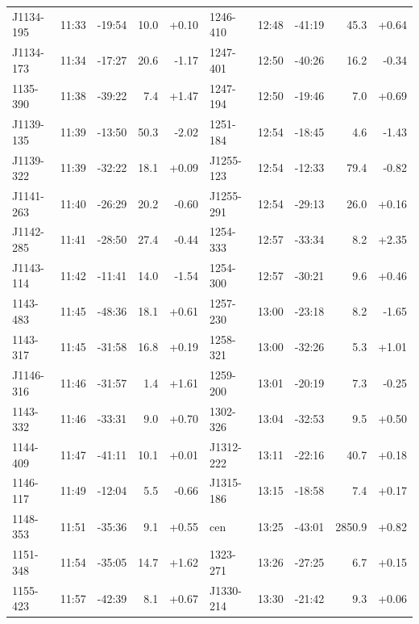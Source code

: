 \documentclass[preprint]{aastex}
\begin{document}
\begin{table}[ht]
\begin{tabular}{l|lrrr||l|lrrr}
 J1134-195 & 11:33 & -19:54 &   10.0 & +0.10 &   1246-410 & 12:48 & -41:19 &   45.3 & +0.64 \\
 J1134-173 & 11:34 & -17:27 &   20.6 & -1.17 &   1247-401 & 12:50 & -40:26 &   16.2 & -0.34 \\
  1135-390 & 11:38 & -39:22 &    7.4 & +1.47 &   1247-194 & 12:50 & -19:46 &    7.0 & +0.69 \\
 J1139-135 & 11:39 & -13:50 &   50.3 & -2.02 &   1251-184 & 12:54 & -18:45 &    4.6 & -1.43 \\
 J1139-322 & 11:39 & -32:22 &   18.1 & +0.09 &  J1255-123 & 12:54 & -12:33 &   79.4 & -0.82 \\
 J1141-263 & 11:40 & -26:29 &   20.2 & -0.60 &  J1255-291 & 12:54 & -29:13 &   26.0 & +0.16 \\
 J1142-285 & 11:41 & -28:50 &   27.4 & -0.44 &   1254-333 & 12:57 & -33:34 &    8.2 & +2.35 \\
 J1143-114 & 11:42 & -11:41 &   14.0 & -1.54 &   1254-300 & 12:57 & -30:21 &    9.6 & +0.46 \\
  1143-483 & 11:45 & -48:36 &   18.1 & +0.61 &   1257-230 & 13:00 & -23:18 &    8.2 & -1.65 \\
  1143-317 & 11:45 & -31:58 &   16.8 & +0.19 &   1258-321 & 13:00 & -32:26 &    5.3 & +1.01 \\
 J1146-316 & 11:46 & -31:57 &    1.4 & +1.61 &   1259-200 & 13:01 & -20:19 &    7.3 & -0.25 \\
  1143-332 & 11:46 & -33:31 &    9.0 & +0.70 &   1302-326 & 13:04 & -32:53 &    9.5 & +0.50 \\
  1144-409 & 11:47 & -41:11 &   10.1 & +0.01 &  J1312-222 & 13:11 & -22:16 &   40.7 & +0.18 \\
  1146-117 & 11:49 & -12:04 &    5.5 & -0.66 &  J1315-186 & 13:15 & -18:58 &    7.4 & +0.17 \\
  1148-353 & 11:51 & -35:36 &    9.1 & +0.55 &        cen & 13:25 & -43:01 & 2850.9 & +0.82 \\
  1151-348 & 11:54 & -35:05 &   14.7 & +1.62 &   1323-271 & 13:26 & -27:25 &    6.7 & +0.15 \\
  1155-423 & 11:57 & -42:39 &    8.1 & +0.67 &  J1330-214 & 13:30 & -21:42 &    9.3 & +0.06 \\
\hline
\end{tabular}
\end{table}
\end{document}
